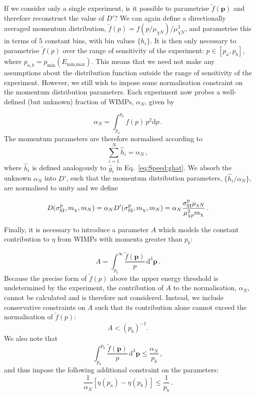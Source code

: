 If we consider only a single experiment, is it possible to parametrise \(\tilde{f}(\mathbf{p})\) and therefore reconstruct the value of $D'$? We can again define a directionally averaged momentum distribution, \(\tilde{f}(p) = f(p/\mu_{\chi N})/\mu_{\chi N}^3\), and parametrise this in terms of 5 constant bins, with bin values \(\{h_i\}\). It is then only necessary to parametrise \(\tilde{f}(p)\) over the range of sensitivity of the experiment: \(p \in \left[p_a, p_b\right]\), where \(p_{a,b} = p_\textrm{min}(E_\textrm{min,max})\). This means that we need not make any assumptions about the distribution function outside the range of sensitivity of the experiment. However, we still wish to impose some normalisation constraint on the momentum distribution parameters. Each experiment now probes a well-defined (but unknown) fraction of WIMPs, \(\alpha_N\), given by

\begin{equation}
\alpha_N = \int_{p_a}^{p_b} f(p) \, p^2 \textrm{d}p\,.
\end{equation}
The momentum parameters are therefore normalised according to
\begin{equation}
\sum_{i = 1}^N \hat{h}_i = \alpha_N \,,
\end{equation}
where \(\hat{h}_i\) is defined analogously to \(\hat{g}_i\) in Eq.\ \ref{eq:Speed:ghat}. We absorb the unknown \(\alpha_N\) into \(D'\), such that the momentum distribution parameters, \(\{\hat{h}_i/\alpha_N\}\), are normalised to unity and we define

\begin{equation}
\label{eq:Speed:D}
D(\sigmapsi,m_\chi,m_N) =  \alpha_N D'(\sigmapsi,m_\chi,m_N) =\alpha_N \frac{\sigmapsi \mu_{\chi N}}{\mu_{\chi p}^2 m_\chi}\,.
\end{equation}

Finally, it is necessary to introduce a parameter \(A\) which models the constant contribution to \(\eta\) from WIMPs with momenta greater than \(p_b\):

\begin{equation}
A = \int_{p_b}^\infty \frac{\tilde{f}(\textbf{p})}{p}\, \textrm{d}^3\textbf{p}\,.
\end{equation}
Because the precise form of \(\tilde{f}(p)\) above the upper energy threshold is undetermined by the experiment, the contribution of \(A\) to the normalisation, \(\alpha_N\), cannot be calculated and is therefore not considered. Instead, we include conservative constraints on \(A\) such that its contribution alone cannot exceed the normalisation of \(\tilde{f}(p)\):
\begin{equation}
A < (p_b)^{-1}.
\end{equation}
We also note that
\begin{equation}
\int_{p_a}^{p_b} \frac{\tilde{f}(\textbf{p})}{p} \, \textrm{d}^3\textbf{p} \leq \frac{\alpha_N}{p_b} \,,
\end{equation}
and thus impose the following additional constraint on the parameters:
\begin{equation}
\frac{1}{\alpha_N}\left[\eta(p_a) - \eta(p_b)\right] \leq \frac{1}{p_b}\,.
\end{equation}

